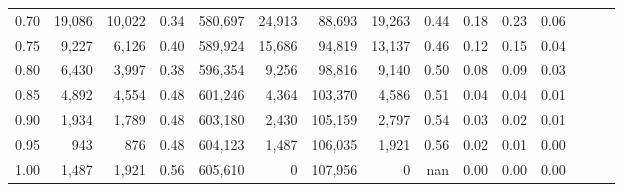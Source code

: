 \begin{tabular}{rrrrrrrrrrrrrrr}
0.70 &   19,086 &  10,022 &  0.34 &  580,697 &   24,913 &   88,693 &   19,263 &  0.44 &  0.18 &  0.23 &      0.06 \\
0.75 &    9,227 &   6,126 &  0.40 &  589,924 &   15,686 &   94,819 &   13,137 &  0.46 &  0.12 &  0.15 &      0.04 \\
0.80 &    6,430 &   3,997 &  0.38 &  596,354 &    9,256 &   98,816 &    9,140 &  0.50 &  0.08 &  0.09 &      0.03 \\
0.85 &    4,892 &   4,554 &  0.48 &  601,246 &    4,364 &  103,370 &    4,586 &  0.51 &  0.04 &  0.04 &      0.01 \\
0.90 &    1,934 &   1,789 &  0.48 &  603,180 &    2,430 &  105,159 &    2,797 &  0.54 &  0.03 &  0.02 &      0.01 \\
0.95 &      943 &     876 &  0.48 &  604,123 &    1,487 &  106,035 &    1,921 &  0.56 &  0.02 &  0.01 &      0.00 \\
1.00 &    1,487 &   1,921 &  0.56 &  605,610 &        0 &  107,956 &        0 &   nan &  0.00 &  0.00 &      0.00 \\
\bottomrule
\end{tabular}
